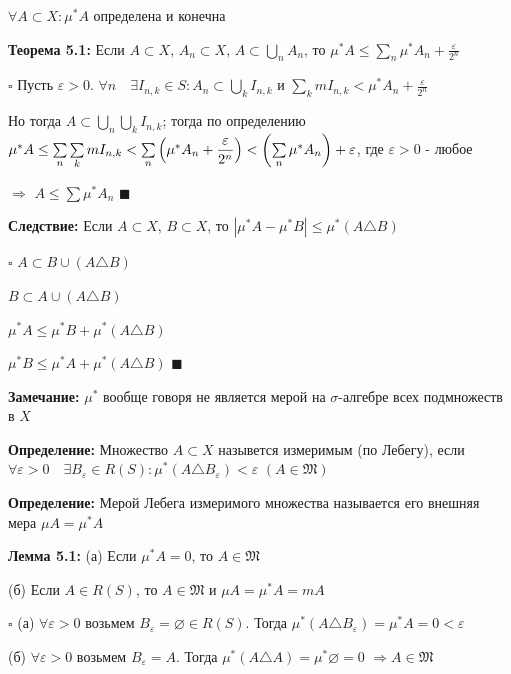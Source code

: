 \documentclass[a4paper]{report}
\newcommand*{\hm}[1]{#1\nobreak\discretionary{}%
            {\hbox{$\mathsurround=0pt #1$}}{}}
\begin{document}
$\forall A\subset X\colon\mu^*A$ определена и конечна
\bigskip

\noindent\textbf{Теорема 5.1:} Если $A\subset X$, $A_n\subset X$, $A\subset\bigcup\limits_n A_n$, то $\mu^*A\le
\sum\limits_n\mu^*A_n+\displaystyle\frac{\varepsilon}{2^n}$

\noindent $\square$ Пусть $\varepsilon>0$. $\forall n\quad\exists I_{n,k}\in S\colon A_n\subset\bigcup\limits_k I_{n,k}$
и $\sum\limits_k mI_{n,k}<\mu^*A_n+\displaystyle\frac{\varepsilon}{2^n}$

Но тогда $A\subset\bigcup\limits_n\bigcup\limits_k I_{n,k}$; тогда по определению $\mu^*A\le\sum\limits_n\sum\limits_k
mI_{n,k}\hm<\sum\limits_n\left(\mu^*A_n+\displaystyle\frac{\varepsilon}{2^n}\right)<\left(\sum\limits_n\mu^* A_n\right)+\varepsilon$,
где $\varepsilon>0$ - любое

$\Rightarrow$ $A\le\sum\mu^*A_n$ $\blacksquare$
\bigskip

\noindent\textbf{Следствие:} Если $A\subset X$, $B\subset X$, то $|\mu^*A-\mu^*B|\le\mu^*(A\triangle B)$

\noindent $\square$ $A\subset B\cup(A\triangle B)$

$B\subset A\cup(A\triangle B)$

$\mu^*A\le\mu^*B+\mu^*(A\triangle B)$

$\mu^*B\le\mu^*A+\mu^*(A\triangle B)$ $\blacksquare$
\bigskip

\noindent\textbf{Замечание:} $\mu^*$ вообще говоря не является мерой на $\sigma$-алгебре всех подмножеств в $X$
\bigskip

\noindent\textbf{Определение:} Множество $A\subset X$ назывется измеримым (по Лебегу), если $\forall\varepsilon>0\quad
\exists B_\varepsilon\in R(S)\colon\mu^*(A\triangle B_\varepsilon)<\varepsilon$ $(A\in\mathfrak M)$
\bigskip

\noindent\textbf{Определение:} Мерой Лебега измеримого множества называется его внешняя мера $\mu A=\mu^*A$
\bigskip
\bigskip
\bigskip

\noindent\textbf{Лемма 5.1:} (а) Если $\mu^*A=0$, то $A\in\mathfrak M$

(б) Если $A\in R(S)$, то $A\in\mathfrak M$ и $\mu A=\mu^*A=mA$

\noindent $\square$ (а) $\forall\varepsilon>0$ возьмем $B_\varepsilon=\varnothing\in R(S)$. Тогда $\mu^*(A\triangle B_\varepsilon)=
\mu^*A=0<\varepsilon$

(б) $\forall\varepsilon>0$ возьмем $B_\varepsilon=A$. Тогда  $\mu^*(A\triangle A)=\mu^*\varnothing=0$ $\Rightarrow A\in\mathfrak M$
\end{document}
